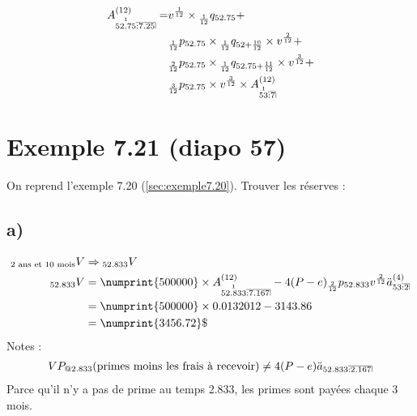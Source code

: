 \documentclass[11pt,french]{report}
\makeatletter
\DeclareRobustCommand{\annuity}[1]{%
\def\arraystretch{0}%
\setlength\arraycolsep{.7pt}%
\setlength\arrayrulewidth{.3pt}%
\begin{array}[b]{@{}c|}\hline
\\[\arraycolsep]%
\scriptstyle #1%
\end{array}%
}
\newcommand{\indiceGauche}[2]{{\vphantom{#2}}_{#1}#2}
\makeatother
\begin{document}
\begin{align*}
A_{\overset{1}{52.75} \annuity{:7.25}}^{(12)} =& v^{\frac{1}{12}} \times \indiceGauche{\frac{1}{12}}{q}_{52.75} + \\
&\indiceGauche{\frac{1}{12}}{p}_{52.75} \times \indiceGauche{\frac{1}{12}}{q}_{52 + \frac{10}{12}}  \times v^{\frac{2}{12}} + \\
&\indiceGauche{\frac{2}{12}}{p}_{52.75} \times \indiceGauche{\frac{1}{12}}{q}_{52.75 + \frac{11}{12}}  \times v^{\frac{3}{12}} + \\
&\indiceGauche{\frac{3}{12}}{p}_{52.75} \times  v^{\frac{3}{12}} \times  A_{\overset{1}{53} \annuity{:7}}^{(12)}
\end{align*}

\section{Exemple 7.21 (diapo 57)}
On reprend l'exemple 7.20 (\ref{sec:exemple7.20}).
Trouver les réserves :
\subsection*{a) } 
\begin{align*}
\indiceGauche{\text{2 ans et 10 mois}}{V} &\Rightarrow \indiceGauche{52.833}{V} \\
\indiceGauche{52.833}{V} &= \numprint{500000} \times A_{\overset{1}{52.833} \annuity{:7.167}}^{(12)} - 4(P- e) \indiceGauche{\frac{2}{12}}{p}_{52.833} v^{\frac{2}{12}} \ddot{a}_{53 \annuity{:2}}^{(4)} \\
&= \numprint{500000}\times 0.0132012 - 3143.86\\
&= \numprint{3456.72}\$
\end{align*}
Notes :
\begin{align*}
VP_{@2.833}(\text{primes moins les frais à recevoir}) &\neq  4(P- e)  \ddot{a}_{52.833 \annuity{:2.167}} \\
\end{align*}
Parce qu'il n'y a pas de prime au temps 2.833, les primes sont payées chaque 3 mois.
\end{document}
